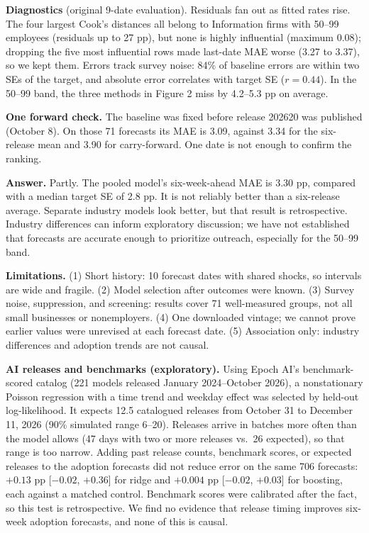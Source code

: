 \documentclass[10pt]{article}
\renewcommand{\section}[1]{\needspace{5\baselineskip}\vspace{5pt}{\large\bfseries #1\par}\vspace{1pt}}
\begin{document}
\textbf{Diagnostics} (original 9-date evaluation). Residuals fan out as fitted rates rise. The four largest Cook's distances all belong to Information firms with 50--99 employees (residuals up to 27 pp), but none is highly influential (maximum 0.08); dropping the five most influential rows made last-date MAE worse (3.27 to 3.37), so we kept them. Errors track survey noise: 84\% of baseline errors are within two SEs of the target, and absolute error correlates with target SE ($r = 0.44$). In the 50--99 band, the three methods in Figure 2 miss by 4.2--5.3 pp on average.

\textbf{One forward check.} The baseline was fixed before release 202620 was published (October 8). On those 71 forecasts its MAE is 3.09, against 3.34 for the six-release mean and 3.90 for carry-forward. One date is not enough to confirm the ranking.

\section{5. Preliminary answer, limitations, next steps}
\textbf{Answer.} Partly. The pooled model's six-week-ahead MAE is 3.30 pp, compared with a median target SE of 2.8 pp. It is not reliably better than a six-release average. Separate industry models look better, but that result is retrospective. Industry differences can inform exploratory discussion; we have not established that forecasts are accurate enough to prioritize outreach, especially for the 50--99 band.

\textbf{Limitations.} (1) Short history: 10 forecast dates with shared shocks, so intervals are wide and fragile. (2) Model selection after outcomes were known. (3) Survey noise, suppression, and screening: results cover 71 well-measured groups, not all small businesses or nonemployers. (4) One downloaded vintage; we cannot prove earlier values were unrevised at each forecast date. (5) Association only: industry differences and adoption trends are not causal.

\textbf{AI releases and benchmarks (exploratory).} Using Epoch AI's benchmark-scored catalog (221 models released January 2024--October 2026), a nonstationary Poisson regression with a time trend and weekday effect was selected by held-out log-likelihood. It expects 12.5 catalogued releases from October 31 to December 11, 2026 (90\% simulated range 6--20). Releases arrive in batches more often than the model allows (47 days with two or more releases vs.\ 26 expected), so that range is too narrow. Adding past release counts, benchmark scores, or expected releases to the adoption forecasts did not reduce error on the same 706 forecasts: $+0.13$ pp [$-0.02$, $+0.36$] for ridge and $+0.004$ pp [$-0.02$, $+0.03$] for boosting, each against a matched control. Benchmark scores were calibrated after the fact, so this test is retrospective. We find no evidence that release timing improves six-week adoption forecasts, and none of this is causal.
\end{document}
